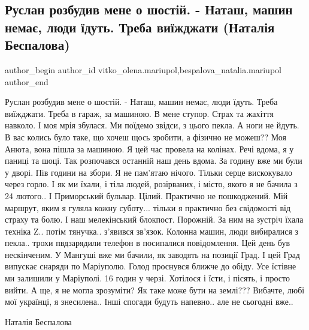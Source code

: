  
 
 
 
 

\subsection{Руслан розбудив мене о шостій.  - Наташ, машин немає, люди їдуть. Треба виїжджати (Наталія Беспалова)}
\label{sec:17_03_2023.fb.vitko_olena.mariupol.1.ruslan_rozbudiv_mene}
 
\ifcmt
 author_begin
   author_id vitko_olena.mariupol,bespalova_natalia.mariupol
 author_end
\fi

Руслан розбудив мене о шостій.  - Наташ, машин немає, люди їдуть.  Треба
виїжджати.  Треба в гараж, за машиною. В мене ступор.  Страх та жахіття
навколо. І  моя мрія збулася. Ми поїдемо звідси, з цього пекла.  А ноги не
йдуть. В вас колись було таке, що хочеш щось зробити, а фізично не можеш?? Моя
Анюта, вона пішла за машиною.  Я цей час провела на колінах. Речі вдома, я у
паниці та шоці. Так розпочався останній наш день вдома. За годину вже ми були у
дворі. Пів години  на збори.  Я не пам'ятаю нічого. Тільки серце вискокувало
через горло.  І як ми їхали, і тіла людей, розірваних, і місто, якого я не
бачила з 24 лютого.. І Приморський бульвар.  Цілий. Практично не пошкоджений.
Мій маршрут, яким я гуляла кожну суботу... тільки я практично без свідомості
від страху  та болю. І наш мелекінський блокпост. Порожній. За ним на зустріч
їхала техніка Z.. потім тянучка.. з'явився зв'язок. Колонна машин, люди
вибиралися з пекла.. трохи пвдзарядили телефон в посипалися повідомлення. Цей
день був нескінченим.  У Мангуші вже ми бачили, як заводять на позиції Град. І
цей Град  випускає снаряди по Маріуполю. Голод  проснувся ближче до обіду. Усе
їстівне  ми залишили у Маріуполі. 16  годин у черзі. Хотілося і їсти, і пісять,
і просто вийти. А ще, я не могла зрозуміти? Як таке може бути на землі???
Вибачте, любі мої українці, я  знесилена.. Інші спогади будуть напевно.. але не
сьогодні вже..

Наталія Беспалова


